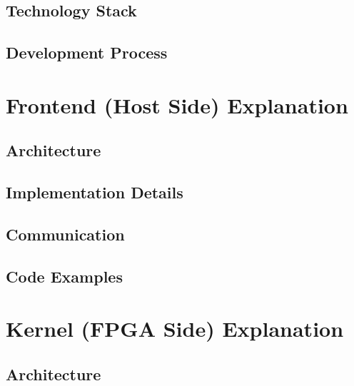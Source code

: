\documentclass[12pt,oneside,a4paper]{article}
\begin{document}
\subsection{Technology Stack}

\subsection{Development Process}


\section{Frontend (Host Side) Explanation} 

\subsection{Architecture}

\subsection{Implementation Details}

\subsection{Communication}

\subsection{Code Examples}



\section{Kernel (FPGA Side) Explanation} 

\subsection{Architecture}
\end{document}
